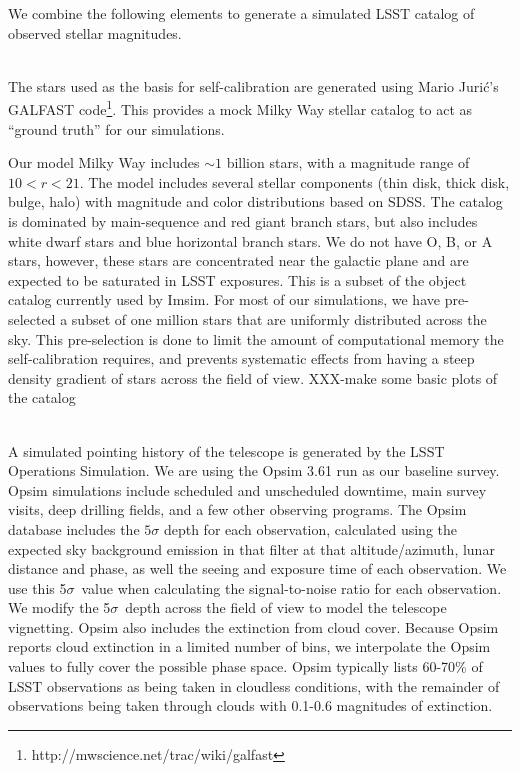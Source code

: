 \documentclass[12pt,preprint]{aastex}
\begin{document}
We combine the following elements to generate a simulated LSST catalog of observed stellar magnitudes.

\\
The stars used as the basis for self-calibration are generated using Mario Juri\'{c}'s GALFAST code\footnote{ http://mwscience.net/trac/wiki/galfast}.  This provides a mock Milky Way stellar catalog to act as ``ground truth'' for our simulations.  

Our model Milky Way includes $\sim1$ billion stars, with a magnitude range of $10 < r < 21$.  The model includes several stellar components (thin disk, thick disk, bulge, halo) with magnitude and color distributions based on SDSS. The catalog is dominated by main-sequence and red giant branch stars, but also includes white dwarf stars and blue horizontal branch stars.  We do not have O, B, or A stars, however, these stars are concentrated near the galactic plane and are expected to be saturated in LSST exposures.  This is a subset of the object catalog currently used by Imsim.  For most of our simulations, we have pre-selected a subset of one million stars that are uniformly distributed across the sky.  This pre-selection is done to limit the amount of computational memory the self-calibration requires, and prevents systematic effects from having a steep density gradient of stars across the field of view.  XXX-make some basic plots of the catalog


\\
A simulated pointing history of the telescope is generated by the LSST Operations Simulation. We are using the Opsim 3.61 run as our baseline survey.  Opsim simulations include scheduled and unscheduled downtime, main survey visits, deep drilling fields, and a few other observing programs. The Opsim database includes the $5\sigma$ depth for each observation, calculated using the expected sky background emission in that filter at that altitude/azimuth, lunar distance and phase, as well the seeing and exposure time of each observation.  We use this 5$\sigma$\ value when calculating the signal-to-noise ratio for each observation.  We modify the 5$\sigma$\ depth across the field of view to model the telescope vignetting.  Opsim also includes the extinction from cloud cover.  Because Opsim reports cloud extinction in a limited number of bins, we interpolate the Opsim values to fully cover the possible phase space.  Opsim typically lists 60-70\% of LSST observations as being taken in cloudless conditions, with the remainder of observations being taken through clouds with 0.1-0.6 magnitudes of extinction.  
\end{document}
